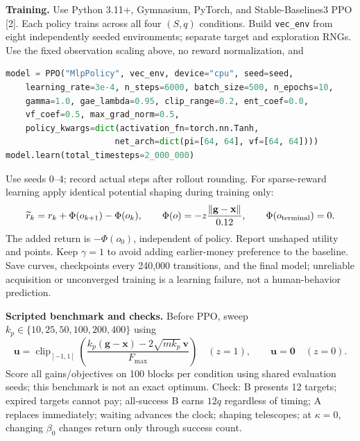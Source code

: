 \documentclass[10pt,letterpaper]{article}
\begin{document}
\textbf{Training.} Use Python 3.11+, Gymnasium, PyTorch, and Stable-Baselines3 PPO [2]. Each policy trains across all four $(S,q)$ conditions. Build \texttt{vec\_env} from eight independently seeded environments; separate target and exploration RNGs. Use the fixed observation scaling above, no reward normalization, and
\begin{lstlisting}[language=Python]
model = PPO("MlpPolicy", vec_env, device="cpu", seed=seed,
    learning_rate=3e-4, n_steps=6000, batch_size=500, n_epochs=10,
    gamma=1.0, gae_lambda=0.95, clip_range=0.2, ent_coef=0.0,
    vf_coef=0.5, max_grad_norm=0.5,
    policy_kwargs=dict(activation_fn=torch.nn.Tanh,
                      net_arch=dict(pi=[64, 64], vf=[64, 64])))
model.learn(total_timesteps=2_000_000)
\end{lstlisting}
Use seeds 0--4; record actual steps after rollout rounding. For sparse-reward learning apply identical potential shaping during training only:
\[
\widetilde r_k=r_k+\Phi(o_{k+1})-\Phi(o_k),
\qquad \Phi(o)=-z\frac{\|\mathbf g-\mathbf x\|}{0.12},
\qquad \Phi(o_{\rm terminal})=0.
\]
The added return is $-\Phi(o_0)$, independent of policy. Report unshaped utility and points. Keep $\gamma=1$ to avoid adding earlier-money preference to the baseline. Save curves, checkpoints every 240,000 transitions, and the final model; unreliable acquisition or unconverged training is a learning failure, not a human-behavior prediction.

\textbf{Scripted benchmark and checks.} Before PPO, sweep $k_p\in\{10,25,50,100,200,400\}$ using
\[
\mathbf u=\operatorname{clip}_{[-1,1]}
\left(\frac{k_p(\mathbf g-\mathbf x)-2\sqrt{m k_p}\,\mathbf v}{F_{\max}}\right)
\quad(z=1),\qquad \mathbf u=\mathbf0\quad(z=0).
\]
Score all gains/objectives on 100 blocks per condition using shared evaluation seeds; this benchmark is not an exact optimum. Check: B presents 12 targets; expired targets cannot pay; all-success B earns $12q$ regardless of timing; A replaces immediately; waiting advances the clock; shaping telescopes; at $\kappa=0$, changing $\beta_0$ changes return only through success count.
\end{document}
